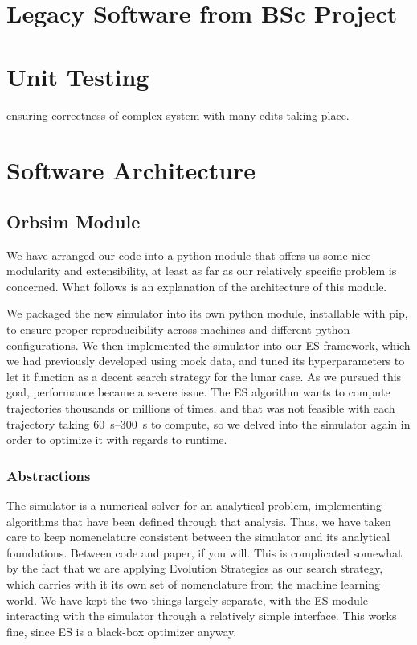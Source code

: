 \section{Legacy Software from BSc Project}
\section{Unit Testing}
ensuring correctness of complex system with many edits taking place.
\section{Software Architecture}
\subsection{Orbsim Module}
We have arranged our code into a python module that offers us some nice modularity and extensibility, at least as far as our relatively specific problem is concerned. What follows is an explanation of the architecture of this module.

We packaged the new simulator into its own python module, installable with pip, to ensure proper reproducibility across machines and different python configurations. We then implemented the simulator into our ES framework, which we had previously developed using mock data, and tuned its hyperparameters to let it function as a decent search strategy for the lunar case. As we pursued this goal, performance became a severe issue. The ES algorithm wants to compute trajectories thousands or millions of times, and that was not feasible with each trajectory taking \SIrange{60}{300}{\second} to compute, so we delved into the simulator again in order to optimize it with regards to runtime.

\subsubsection{Abstractions}

The simulator is a numerical solver for an analytical problem, implementing algorithms that have been defined through that analysis. Thus, we have taken care to keep nomenclature consistent between the simulator and its analytical foundations. Between code and paper, if you will. This is complicated somewhat by the fact that we are applying Evolution Strategies as our search strategy, which carries with it its own set of nomenclature from the machine learning world. We have kept the two things largely separate, with the ES module interacting with the simulator through a relatively simple interface. This works fine, since ES is a black-box optimizer anyway.


